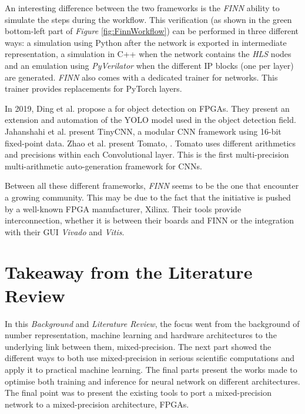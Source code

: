 An interesting difference between the two frameworks is the \emph{FINN} ability to simulate the steps during the workflow. This verification (as shown in the green bottom-left part of \emph{Figure} \ref{fig:FinnWorkflow}) can be performed in three different ways: a simulation using Python after the network is exported in intermediate representation, a simulation in C++ when the network contains the \emph{HLS} nodes and an emulation using \emph{PyVerilator} when the different IP blocks (one per layer) are generated. \emph{FINN} also comes with a dedicated trainer for networks. This trainer provides  replacements for PyTorch layers.

In 2019, Ding et al. \cite{Ding2019} propose a  for object detection on FPGAs. They present an extension and automation of the YOLO model used in the object detection field. Jahanshahi et al. \cite{Jahanshahi2019} present TinyCNN, a modular CNN framework using 16-bit fixed-point data. Zhao et al. \cite{Zhao2019} present Tomato, . Tomato uses different arithmetics and precisions within each Convolutional layer. This is the first multi-precision multi-arithmetic auto-generation framework for CNNs.

Between all these different frameworks, \emph{FINN} seems to be the one that encounter a growing community. This may be due to the fact that the initiative is pushed by a well-known FPGA manufacturer, Xilinx. Their tools provide interconnection, whether it is between their boards and FINN or the integration with their GUI \emph{Vivado} and \emph{Vitis}.


\section{Takeaway from the Literature Review}
In this \emph{Background} and \emph{Literature Review}, the focus went from the background of number representation, machine learning and hardware architectures to the underlying link between them, mixed-precision. The next part showed the different ways to both use mixed-precision in serious scientific computations and apply it to practical machine learning. The final parts present the works made to optimise both training and inference for neural network on different architectures. The final point was to present the existing tools to port a mixed-precision network to a  mixed-precision architecture, FPGAs.

